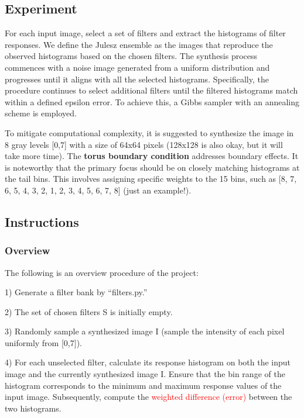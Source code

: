\documentclass[11pt]{article}
\begin{document}
\subsection{Experiment}

For each input image, select a set of filters and extract the histograms of filter responses. We define the Julesz ensemble as the images that reproduce the observed histograms based on the chosen filters. The synthesis process commences with a noise image generated from a uniform distribution and progresses until it aligns with all the selected histograms. Specifically, the procedure continues to select additional filters until the filtered histograms match within a defined epsilon error. To achieve this, a Gibbs sampler with an annealing scheme is employed. 

To mitigate computational complexity, it is suggested to synthesize the image in 8 gray levels {[}0,7{]} with a size of 64x64 pixels (128x128 is also okay, but it will take more time). The \textbf{torus boundary condition} addresses boundary effects. It is noteworthy that the primary focus should be on closely matching histograms at the tail bins. This involves assigning specific weights to the 15 bins, such as {[8, 7, 6, 5, 4, 3, 2, 1, 2, 3, 4, 5, 6, 7, 8]} (just an example!).

\subsection{Instructions}

\subsubsection{Overview}\label{subsubsec:overview}

The following is an overview procedure of the project:

1) Generate a filter bank by ``filters.py.''

2) The set of chosen filters S is initially empty.

3) Randomly sample a synthesized image I (sample the intensity of each pixel uniformly from {[}0,7{]}).

4) For each unselected filter, calculate its response histogram on both the input image and the currently synthesized image I. Ensure that the bin range of the histogram corresponds to the minimum and maximum response values of the input image. Subsequently, compute the \textcolor{red}{weighted difference (error)} between the two histograms.
\end{document}
